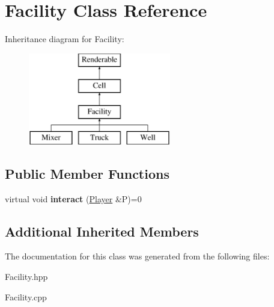 \hypertarget{class_facility}{}\section{Facility Class Reference}
\label{class_facility}
Inheritance diagram for Facility\+:\begin{figure}[H]
\begin{center}
\leavevmode
\includegraphics[height=4.000000cm]{class_facility}
\end{center}
\end{figure}
\subsection*{Public Member Functions}
\begin{DoxyCompactItemize}
\item 
\mbox{\label{class_facility_af379e05c8bee2120210e7591545123f6}} 
virtual void {\bfseries interact} (\mbox{\hyperlink{class_player}{Player}} \&P)=0
\end{DoxyCompactItemize}
\subsection*{Additional Inherited Members}


The documentation for this class was generated from the following files\+:\begin{DoxyCompactItemize}
\item 
Facility.\+hpp\item 
Facility.\+cpp\end{DoxyCompactItemize}
